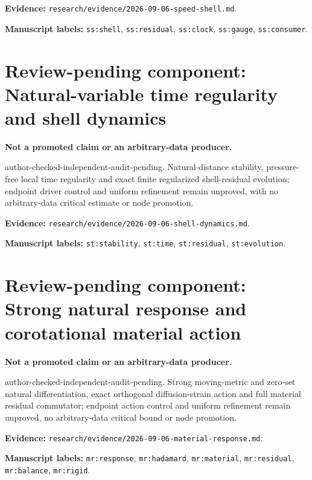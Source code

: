\documentclass[10pt]{article}
\begin{document}
\textbf{Evidence:} \texttt{research/evidence/2026-09-06-speed-shell.md}.

\textbf{Manuscript labels:} \texttt{ss:shell}, \texttt{ss:residual}, \texttt{ss:clock}, \texttt{ss:gauge}, \texttt{ss:consumer}.
\clearpage\section*{Review-pending component: Natural-variable time regularity and shell dynamics}
\textbf{Not a promoted claim or an arbitrary-data producer.}

author-checked-independent-audit-pending. Natural-distance stability, pressure-free local time regularity and exact finite regularized shell-residual evolution; endpoint driver control and uniform refinement remain unproved, with no arbitrary-data critical estimate or node promotion.

\textbf{Evidence:} \texttt{research/evidence/2026-09-06-shell-dynamics.md}.

\textbf{Manuscript labels:} \texttt{st:stability}, \texttt{st:time}, \texttt{st:residual}, \texttt{st:evolution}.
\clearpage\section*{Review-pending component: Strong natural response and corotational material action}
\textbf{Not a promoted claim or an arbitrary-data producer.}

author-checked-independent-audit-pending. Strong moving-metric and zero-set natural differentiation, exact orthogonal diffusion-strain action and full material residual commutator; endpoint action control and uniform refinement remain unproved, no arbitrary-data critical bound or node promotion.

\textbf{Evidence:} \texttt{research/evidence/2026-09-06-material-response.md}.

\textbf{Manuscript labels:} \texttt{mr:response}, \texttt{mr:hadamard}, \texttt{mr:material}, \texttt{mr:residual}, \texttt{mr:balance}, \texttt{mr:rigid}.
\end{document}
